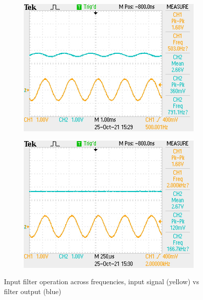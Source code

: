 \documentclass[a4paper,11pt]{article}
\begin{document}
\begin{figure}[h!]
\begin{subfigure}{0.3\textwidth}
    \includegraphics[width=\columnwidth]{input_filter/input_500Hz.JPG}
  \end{subfigure}
  \begin{subfigure}{0.3\textwidth}
    \includegraphics[width=\columnwidth]{input_filter/input_2kHz.JPG}
  \end{subfigure}
  \caption{Input filter operation across frequencies, input signal (yellow) vs filter output (blue)}
\end{figure}
\end{document}

